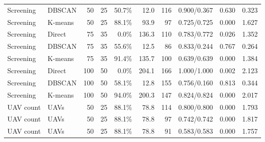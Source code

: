 \begin{table}[H]
\begin{tabularx}{\textwidth}{@{}>{\raggedright\arraybackslash}p{}>{\raggedright\arraybackslash}Xrrrrrrrr@{}}
Screening & DBSCAN & 50 & 25 & 50.7\% & 12.0 & 116 & 0.900/0.367 & 0.630 & 0.323 \\
\rowcolor{gray!10}
Screening & K-means & 50 & 25 & 88.1\% & 93.9 & 97 & 0.725/0.725 & 0.000 & 1.627 \\
Screening & Direct & 75 & 35 & 0.0\% & 136.3 & 110 & 0.783/0.772 & 0.026 & 1.352 \\
Screening & DBSCAN & 75 & 35 & 55.6\% & 12.5 & 86 & 0.833/0.244 & 0.767 & 0.264 \\
\rowcolor{gray!10}
Screening & K-means & 75 & 35 & 91.4\% & 135.7 & 100 & 0.639/0.639 & 0.000 & 1.384 \\
Screening & Direct & 100 & 50 & 0.0\% & 204.1 & 166 & 1.000/1.000 & 0.002 & 2.123 \\
Screening & DBSCAN & 100 & 50 & 58.1\% & 12.8 & 155 & 0.756/0.160 & 0.813 & 0.344 \\
\rowcolor{gray!10}
Screening & K-means & 100 & 50 & 94.0\% & 200.3 & 147 & 0.824/0.824 & 0.000 & 2.017 \\
\addlinespace[2pt]
UAV count & 2 UAVs & 50 & 25 & 88.1\% & 78.8 & 114 & 0.800/0.800 & 0.000 & 1.793 \\
UAV count & 4 UAVs & 50 & 25 & 88.1\% & 78.8 & 97 & 0.742/0.742 & 0.000 & 1.817 \\
\rowcolor{gray!10}
UAV count & 6 UAVs & 50 & 25 & 88.1\% & 78.8 & 91 & 0.583/0.583 & 0.000 & 1.757 \\
\bottomrule
\end{tabularx}
\end{table}
